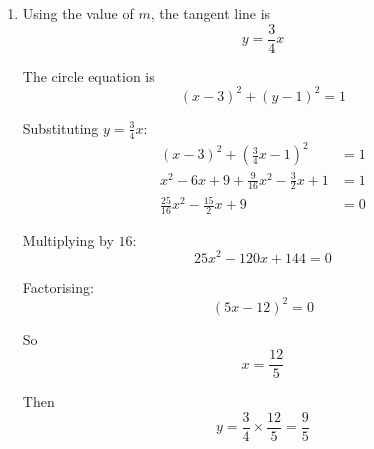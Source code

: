\documentclass[leqno]{article}
\begin{document}
\begin{enumerate}[
  label=\textbf{\arabic*.},
  leftmargin=*,
  topsep=0pt,
  partopsep=0pt,
  parsep=0pt
]
\begin{djsSolution}
\begin{enumerate}[label=\textbf{(\alph*)}]
\begin{enumerate}[label=(\roman*)]
    where
    \[
    m=\tan\alpha
    \]

    For there to be a unique point \(w\) satisfying both conditions, the half-line must touch the circle at exactly one point, so it must be a tangent.

    The circle has equation \((x-3)^2+(y-1)^2=1\). Substituting \(y=mx\):
    \begin{align*}
    (x-3)^2+(mx-1)^2 &= 1 \\
    x^2-6x+9+m^2x^2-2mx+1 &= 1 \\
    (1+m^2)x^2-(6+2m)x+9 &= 0
    \end{align*}

    For a tangent this quadratic has a repeated root, so its discriminant is zero:
    \begin{align*}
    (6+2m)^2-4(1+m^2)(9) &= 0 \\
    36+24m+4m^2-36-36m^2 &= 0 \\
    24m-32m^2 &= 0 \\
    8m(3-4m) &= 0
    \end{align*}

    So
    \[
    m=0 \quad \text{or} \quad m=\frac34
    \]

    If \(m=0\), then \(\alpha=0\) (the real axis, which touches the circle at \(3\)), but the question states \(0<\alpha<\pi\), so this is not allowed.

    Hence
    \[
    \tan\alpha=\frac34
    \]

    so
    \[
    \alpha=\arctan\left(\frac34\right)\approx 0.644
    \]

    \item Using the value of \(m\), the tangent line is
    \[
    y=\frac34x
    \]

    The circle equation is
    \[
    (x-3)^2+(y-1)^2=1
    \]

    Substituting \(y=\frac34x\):
    \begin{align*}
    (x-3)^2+\left(\frac34x-1\right)^2 &= 1 \\
    x^2-6x+9+\frac{9}{16}x^2-\frac32x+1 &= 1 \\
    \frac{25}{16}x^2-\frac{15}{2}x+9 &= 0
    \end{align*}

    Multiplying by \(16\):
    \[
    25x^2-120x+144=0
    \]

    Factorising:
    \[
    (5x-12)^2=0
    \]

    So
    \[
    x=\frac{12}{5}
    \]

    Then
    \[
    y=\frac34\times\frac{12}{5}=\frac{9}{5}
    \]


\end{enumerate}
\end{enumerate}
\end{djsSolution}
\end{enumerate}
\end{document}
